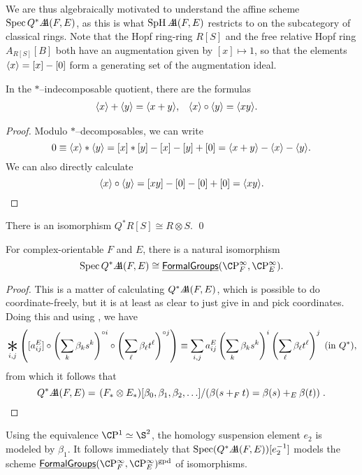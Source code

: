 We are thus algebraically motivated to understand the affine scheme $\Spec Q^* \AA(F, E)$, as this is what $\SpH \AA(F, E)$ restricts to on the subcategory of classical rings.  Note that the Hopf ring-ring $R[S]$ and the free relative Hopf ring $A_{R[S]}[B]$ both have an augmentation given by $[x] \mapsto 1$, so that the elements $\<x\> = [x] - [0]$ form a generating set of the augmentation ideal.
\begin{lemma}\label{ArithmeticInQAst}
In the $\ast$--indecomposable quotient, there are the formulas
\begin{align*}
\<x\> + \<y\> & = \<x + y\>, &
\<x\> \circ \<y\> & = \<x y\>.
\end{align*}
\end{lemma}
\begin{proof}
Modulo $\ast$--decomposables, we can write \[0 \equiv \<x\> \ast \<y\> = [x] \ast [y] - [x] - [y] + [0] = \<x + y\> - \<x\> - \<y\>.\]  We can also directly calculate \[\<x\> \circ \<y\> = [x y] - [0] - [0] + [0] = \<x y\>. \qedhere\]
\end{proof}

\begin{corollary}\label{QAstAndTensors}
There is an isomorphism $Q^* R[S] \cong R \otimes S$. \qed
\end{corollary}

\begin{corollary}
For complex-orientable $F$ and $E$, there is a natural isomorphism \[\Spec Q^* \AA(F, E) \cong \InternalHom{FormalGroups}(\CP^\infty_F, \CP^\infty_E).\]
\end{corollary}
\begin{proof}
This is a matter of calculating $Q^* \AA(F, E)$, which is possible to do coordinate-freely, but it is at least as clear to just give in and pick coordinates.  Doing this and using , we have \[\bigast_{i, j} \left([a_{ij}^E] \circ \left( \sum_k \beta_k s^k \right)^{\circ i} \circ \left( \sum_\ell \beta_\ell t^\ell \right)^{\circ j} \right) \equiv \sum_{i, j} a_{ij}^E \left( \sum_k \beta_k s^k \right)^i \left( \sum_\ell \beta_\ell t^\ell \right)^j \;\text{(in $Q^*$)},\] from which it follows that \[Q^* \AA(F, E) = \left. (F_* \otimes E_*)[\beta_0, \beta_1, \beta_2, \ldots] \middle/ \left( \beta(s +_F t) = \beta(s) +_E \beta(t) \right) \right. . \qedhere\]
\end{proof}

\begin{remark}
Using the equivalence $\CP^1 \simeq \S^2$, the homology suspension element $e_2$ is modeled by $\beta_1$.  It follows immediately that $\Spec (Q^* \AA(F, E))[e_2^{-1}]$ models the scheme $\InternalHom{FormalGroups}(\CP^\infty_F, \CP^\infty_E)^{\mathrm{gpd}}$ of isomorphisms.
\end{remark}

